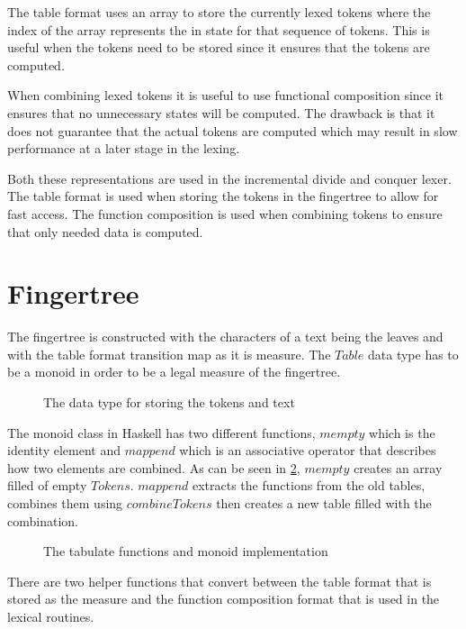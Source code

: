 The table format uses an array to store the currently lexed tokens where the
index of the array represents the in state for that sequence of tokens. This is
useful when the tokens need to be stored since it ensures that the tokens are
computed.

When combining lexed tokens it is useful to use functional composition since it
ensures that no unnecessary states will be computed. The drawback is that it
does not guarantee that the actual tokens are computed which may result in slow
performance at a later stage in the lexing.

Both these representations are used in the incremental divide and conquer lexer.
The table format is used when storing the tokens in the fingertree to allow for
fast access. The function composition is used when combining tokens to ensure
that only needed data is computed.

\section{Fingertree}
The fingertree is constructed with the characters of a text being the leaves and
with the table format transition map as it is measure. The $Table$ data type has
to be a monoid in order to be a legal measure of the fingertree.

\begin{figure}[h!]
  
  \caption{The data type for storing the tokens and text \label{fig:fingertreedt}}
\end{figure}

The monoid class in Haskell has two different functions, $mempty$ which is the
identity element and $mappend$ which is an associative operator that describes
how two elements are combined. As can be seen in \cref{fig:tablemonoid},
$mempty$ creates an array filled of empty $Tokens$. $mappend$ extracts the
functions from the old tables, combines them using $combineTokens$ then creates
a new table filled with the combination.

\begin{figure}[h!]
  
  \caption{The tabulate functions and monoid implementation \label{fig:tablemonoid}}
\end{figure}

There are two helper functions that convert between the table format that is
stored as the measure and the function composition format that is used in the
lexical routines.


